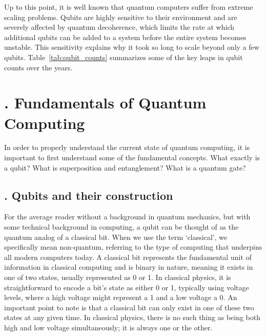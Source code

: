 \documentclass{elbioimp2}
\begin{document}
Up to this point, it is well known that quantum computers suffer from extreme scaling problems. Qubits are highly sensitive to their environment and are severely affected by quantum decoherence, which limits the rate at which additional qubits can be added to a system before the entire system becomes unstable. This sensitivity explains why it took so long to scale beyond only a few qubits. Table~\ref{tab:qubit_counts} summarizes some of the key leaps in qubit counts over the years.

\section{. Fundamentals of Quantum Computing}
In order to properly understand the current state of quantum computing, it is important to first understand
some of the fundamental concepts. What exactly is a qubit? What is superposition and entanglement? What is a quantum gate?

\subsection{. Qubits and their construction}
For the average reader without a background in quantum mechanics, but with some technical background in computing, a qubit can be thought of as the quantum analog of a classical bit. When we use the term `classical', we specifically mean non-quantum, referring to the type of computing that underpins all modern computers today. A classical bit represents the fundamental unit of information in classical computing and is binary in nature, meaning it exists in one of two states, usually represented as 0 or 1. In classical physics, it is straightforward to encode a bit's state as either 0 or 1, typically using voltage levels, where a high voltage might represent a 1 and a low voltage a 0. An important point to note is that a classical bit can only exist in one of these two states at any given time. In classical physics, there is no such thing as being both high and low voltage simultaneously; it is always one or the other.
\end{document}
